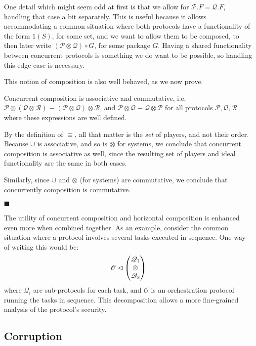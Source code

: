 One detail which might seem odd at first is that we allow
for $\mathscr{P}.F = \mathscr{Q}.F$, handling that case a bit separately.
This is useful because it allows accommodating a common situation
where both protocols have a functionality of the form $1(S)$,
for some set, and we want to allow them to be composed,
to then later write $(\mathscr{P} \otimes \mathscr{Q}) \circ G$,
for some package $G$.
Having a shared functionality between concurrent protocols
is something we do want to be possible, so handling
this edge case is necessary.

This notion of composition is also well behaved, as we now prove.

\begin{lemma}
Concurrent composition is associative and commutative,
i.e. $\mathscr{P} \otimes (\mathscr{Q} \otimes \mathscr{R}) \equiv (\mathscr{P} \otimes \mathscr{Q}) \otimes \mathscr{R}$,
and $\mathscr{P} \otimes \mathscr{Q} \equiv \mathscr{Q} \otimes \mathscr{P}$ for
all protocols $\mathscr{P}, \mathscr{Q}, \mathscr{R}$ where these expressions
are well defined.


By the definition of $\equiv$, all that matter is the \emph{set} of players,
and not their order.
Because $\cup$ is associative, and so is $\otimes$ for systems,
we conclude that concurrent composition is associative as well,
since the resulting set of players and ideal functionality are the same
in both cases.

Similarly, since $\cup$ and $\otimes$ (for systems) are commutative,
we conclude that concurrently composition is commutative.

$\blacksquare$
\end{lemma}

The utility of concurrent composition and horizontal composition
is enhanced even more when combined together.
As an example, consider the common situation where a
protocol involves several tasks executed in sequence.
One way of writing this would be:
$$
\mathscr{O} \lhd
\begin{pmatrix}
  \mathscr{Q}_1\cr
  \otimes\cr
  \mathscr{Q}_2
\end{pmatrix}
$$
where $\mathscr{Q}_i$ are sub-protocols for each task,
and $\mathscr{O}$ is an orchestration protocol running the tasks in sequence.
This decomposition allows a more fine-grained analysis of the protocol's
security.

\subsection{Corruption}


